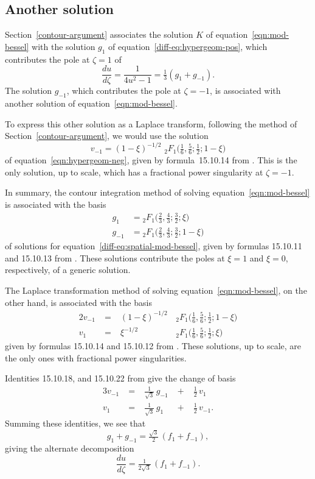 \documentclass{article}
\begin{document}
\subsection{Another solution}
Section~\ref{contour-argument} associates the solution $K$ of equation~\eqref{eqn:mod-bessel} with the solution $g_1$ of equation~\eqref{diff-eq:hypergeom-pos}, which contributes the pole at $\zeta = 1$ of
\[ \frac{du}{d\zeta} = \frac{1}{4u^2 - 1} = \tfrac{1}{3}(g_1 + g_{-1}). \]
The solution $g_{-1}$, which contributes the pole at $\zeta = -1$, is associated with another solution of equation~\ref{eqn:mod-bessel}.

To express this other solution as a Laplace transform, following the method of Section~\ref{contour-argument}, we would use the solution
\[ v_{-1} = (1-\xi)^{-1/2} \,\, {}_2F_1\big(\tfrac{1}{6}, \tfrac{5}{6}; \tfrac{1}{2}; 1-\xi\big) \]
of equation~\ref{eqn:hypergeom-neg}, given by formula~15.10.14 from \cite{dlmf}. This is the only solution, up to scale, which has a fractional power singularity at $\zeta = -1$.

In summary, the contour integration method of solving equation~\eqref{eqn:mod-bessel} is associated with the basis
\begin{align*}
g_{1} & = {}_2F_1\big(\tfrac{2}{3}, \tfrac{4}{3}; \tfrac{3}{2}; \xi\big) \\
g_{-1} & = {}_2F_1\big(\tfrac{2}{3}, \tfrac{4}{3}; \tfrac{3}{2}; 1-\xi\big)
\end{align*}
of solutions for equation~\eqref{diff-eq:spatial-mod-bessel}, given by formulas 15.10.11 and 15.10.13 from \cite{dlmf}. These solutions contribute the poles at $\xi = 1$ and $\xi = 0$, respectively, of a generic solution.

The Laplace transformation method of solving equation~\eqref{eqn:mod-bessel}, on the other hand, is associated with the basis
\begin{alignat*}{2}
v_{-1} &\;=\;& (1-\xi)^{-1/2} & \, {}_2F_1\big(\tfrac{1}{6}, \tfrac{5}{6}; \tfrac{1}{2}; 1-\xi\big) \\
v_1 &\;=\:& \xi^{-1/2} & \, {}_2F_1\big(\tfrac{1}{6}, \tfrac{5}{6}; \tfrac{1}{2}; \xi\big)
\end{alignat*}
given by formulas 15.10.14 and 15.10.12 from \cite{dlmf}. These solutions, up to scale, are the only ones with fractional power singularities.

Identities 15.10.18, and 15.10.22 from \cite{dlmf} give the change of basis
\begin{alignat*}{3}
v_{-1} &\;=\;&\tfrac{1}{\sqrt{3}}\,g_{-1} &\;+\;& \tfrac{1}{2}\,v_1 \\
v_1 &\;=\;& \tfrac{1}{\sqrt{3}}\,g_{1} &\;+\;& \tfrac{1}{2}\,v_{-1}.
\end{alignat*}
Summing these identities, we see that
\[ g_1 + g_{-1} = \tfrac{\sqrt{3}}{2}\,(f_1 + f_{-1}), \]
giving the alternate decomposition
\[ \frac{du}{d\zeta} = \tfrac{1}{2\sqrt{3}}\,(f_1 + f_{-1}). \]
\end{document}
